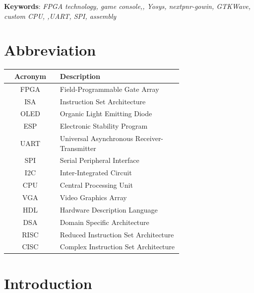 \documentclass[a4paper,12pt]{article}
\begin{document}
    \noindent
    \textbf{Keywords}: \textit{FPGA technology, game console,, Yosys, nextpnr-gowin, GTKWave, custom CPU, ,UART, SPI, assembly}

    \newpage
    \tableofcontents


    \newpage
    \listoffigures
    \setcounter{page}{3}

    \newpage
    \listoftables
    \newpage


    \section*{Abbreviation} 
    \renewcommand{\arraystretch}{2.3}
    \label{tab:acronyms}
    \begin{tabular}{|c|p{0.7\linewidth}|}
    \hline
    \textbf{Acronym} & \textbf{Description} \\
    \hline
    FPGA & Field-Programmable Gate Array \\
    ISA & Instruction Set Architecture \\
    OLED & Organic Light Emitting Diode \\
    ESP & Electronic Stability Program \\
    UART & Universal Asynchronous Receiver-Transmitter \\
    SPI & Serial Peripheral Interface \\
    I2C & Inter-Integrated Circuit \\
    CPU & Central Processing Unit \\
    VGA & Video Graphics Array \\
    HDL & Hardware Description Language \\
    DSA & Domain Specific Architecture\\
    RISC & Reduced Instruction Set Architecture\\
    CISC & Complex Instruction Set Architecture\\
    \hline
    \end{tabular}

    \newpage
    \setcounter{page}{1}
    \section{Introduction}
\end{document}
